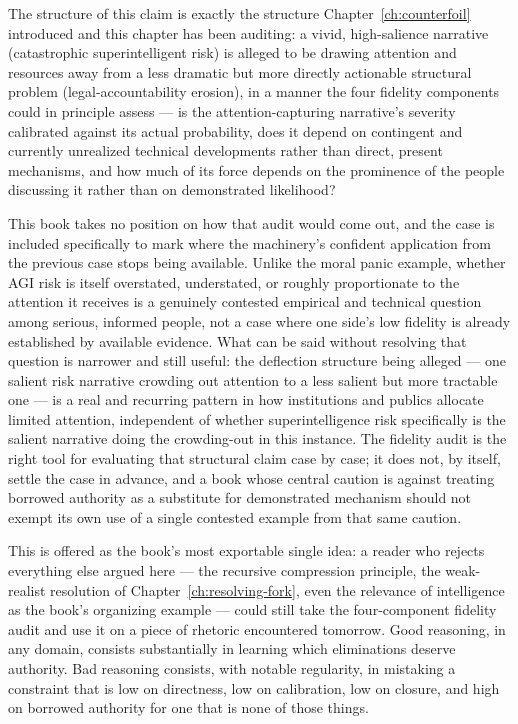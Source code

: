 The structure of this claim is exactly the structure Chapter~\ref{ch:counterfoil} introduced and this chapter has been auditing: a vivid, high-salience narrative (catastrophic superintelligent risk) is alleged to be drawing attention and resources away from a less dramatic but more directly actionable structural problem (legal-accountability erosion), in a manner the four fidelity components could in principle assess --- is the attention-capturing narrative's severity calibrated against its actual probability, does it depend on contingent and currently unrealized technical developments rather than direct, present mechanisms, and how much of its force depends on the prominence of the people discussing it rather than on demonstrated likelihood?

This book takes no position on how that audit would come out, and the case is included specifically to mark where the machinery's confident application from the previous case stops being available. Unlike the moral panic example, whether AGI risk is itself overstated, understated, or roughly proportionate to the attention it receives is a genuinely contested empirical and technical question among serious, informed people, not a case where one side's low fidelity is already established by available evidence. What can be said without resolving that question is narrower and still useful: the deflection structure being alleged --- one salient risk narrative crowding out attention to a less salient but more tractable one --- is a real and recurring pattern in how institutions and publics allocate limited attention, independent of whether superintelligence risk specifically is the salient narrative doing the crowding-out in this instance. The fidelity audit is the right tool for evaluating that structural claim case by case; it does not, by itself, settle the case in advance, and a book whose central caution is against treating borrowed authority as a substitute for demonstrated mechanism should not exempt its own use of a single contested example from that same caution.

This is offered as the book's most exportable single idea: a reader who rejects everything else argued here --- the recursive compression principle, the weak-realist resolution of Chapter~\ref{ch:resolving-fork}, even the relevance of intelligence as the book's organizing example --- could still take the four-component fidelity audit and use it on a piece of rhetoric encountered tomorrow. Good reasoning, in any domain, consists substantially in learning which eliminations deserve authority. Bad reasoning consists, with notable regularity, in mistaking a constraint that is low on directness, low on calibration, low on closure, and high on borrowed authority for one that is none of those things.
